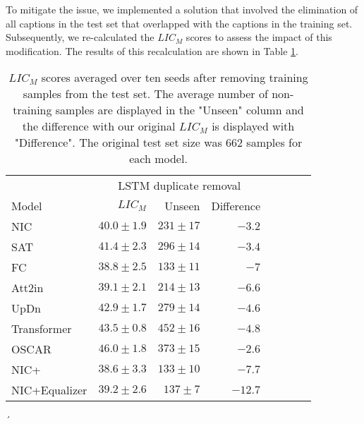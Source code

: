 To mitigate the issue, we implemented a solution that involved the elimination of all captions in the test set that overlapped with the captions in the training set. Subsequently, we re-calculated the $LIC_M$ scores to assess the impact of this modification. The results of this recalculation are shown in Table \ref{table:removeduplicates}.


\begin{table}[H]
\begin{center}
\setlength{\tabcolsep}{6pt} %
\renewcommand{\arraystretch}{1.25} %
\begin{tabular}{lrrrrrrr}
\toprule
\multicolumn{1}{c}{} & 
\multicolumn{3}{c}{LSTM duplicate removal}


\\\cmidrule(r){2-4}
Model & $LIC_M$ & Unseen & Difference \\
\hline
NIC \cite{NIC:2015} & $40.0\pm1.9$ & $231\pm17$ & $-3.2$\\
SAT \cite{SAT:2015} & $41.4\pm2.3$ & $296\pm14$ & $-3.4$\\
FC \cite{Att2inFC:2016} & $38.8\pm2.5$ & $133\pm11$ & $-7$ \\
Att2in \cite{Att2inFC:2016} & $39.1\pm2.1$ & $214\pm13$ & $-6.6$ \\
UpDn \cite{UpDn:2017} & $42.9\pm1.7$ & $279\pm14$ & $-4.6$ \\
Transformer \cite{transformer:2017} & $43.5\pm0.8$ & $452\pm16$ & $-4.8$ \\
OSCAR \cite{OSCAR:2020} & $46.0\pm1.8$ & $373\pm15$ & \textcolor{numbergreen}{$-2.6$} \\
NIC+ \cite{NICplusNICEqualizer:2018} & $38.6\pm3.3$ & $133\pm10$ & $-7.7$ \\
NIC+Equalizer \cite{NICplusNICEqualizer:2018} & $39.2\pm2.6$ & $137\pm7$ & \textcolor{numberred}{$-12.7$} \\

\bottomrule
\end{tabular}
\caption{$LIC_M$ scores averaged over ten seeds after removing training samples from the test set. The average number of non-training samples are displayed in the "Unseen" column and the difference with our original $LIC_M$ is displayed with "Difference". The original test set size was 662 samples for each model.}´
\label{table:removeduplicates}
\end{center}
\end{table}

